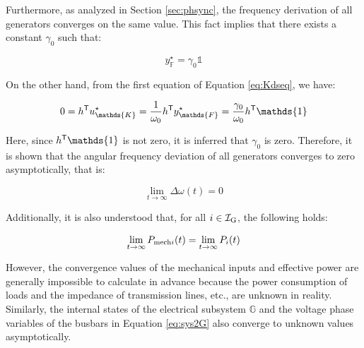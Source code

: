 \documentclass[graybox, envcountchap]{svmult}
\begin{document}
Furthermore, as analyzed in Section \ref{sec:phsync}, the frequency derivation
of all generators converges on the same value. This fact implies that there
exists a constant $\gamma_0$ such that:

\[
  y^{\star}_{\mathds{F}} = \gamma_0 \mathds{1}
\]

On the other hand, from the first equation of Equation \ref{eq:Kdseq}, we have:

\[
  0=h^{\sf T} u_{\mathds{K}}^{\star} 
  = \frac{1}{\omega_0}h^{\sf T} y^{\star}_{\mathds{F}}
  =\frac{\gamma_0}{\omega_0} h^{\sf T} \mathds{1}
\]

Here, since $h^{\sf T} \mathds{1}$ is not zero, it is inferred that $\gamma_0$
is zero. Therefore, it is shown that the angular frequency deviation of all
generators converges to zero asymptotically, that is:

\[
  \lim_{t\rightarrow \infty}
  \Delta \omega (t) = 0
\]

Additionally, it is also understood that, for all $i\in \mathcal{I}_{\rm G}$,
the following holds:

\[
  \lim_{t\rightarrow \infty}
  P_{{\rm mech}i}(t) 
  =
  \lim_{t\rightarrow \infty} P_i (t)
\]

However, the convergence values of the mechanical inputs and effective power are
generally impossible to calculate in advance because the power consumption of
loads and the impedance of transmission lines, etc., are unknown in reality.
Similarly, the internal states of the electrical subsystem $\mathds{G}$ and the
voltage phase variables of the busbars in Equation \ref{eq:sys2G} also converge
to unknown values asymptotically.
\end{document}
